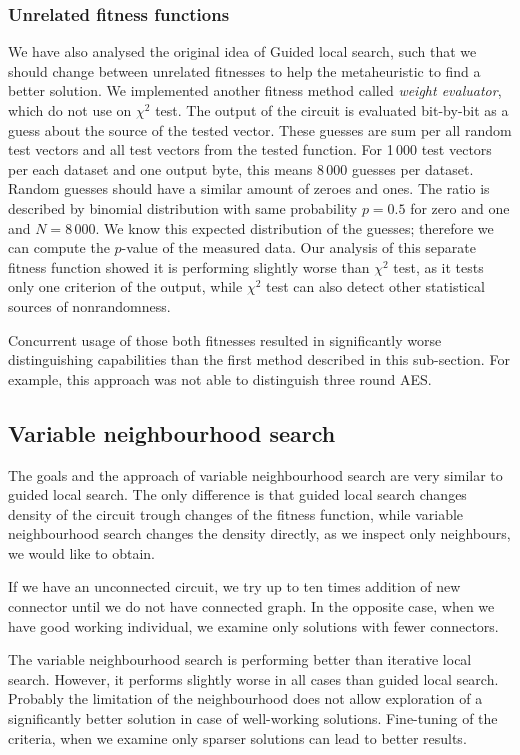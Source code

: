 \documentclass[
  print, %
  Table,   %
  nolof,     %
  nolot,     %
  11pt, %
  oneside  %
]{fithesis3}
\begin{document}
\subsubsection{\textbf{Unrelated fitness functions}}

We have also analysed the original idea of Guided local search, such that we should change between unrelated fitnesses to help the metaheuristic to find a better solution. We implemented another fitness method called \textit{weight evaluator}, which do not use on $\chi^{2}$ test. The output of the circuit is evaluated bit-by-bit as a guess about the source of the tested vector. These guesses are sum per all random test vectors and all test vectors from the tested function. For 1\,000 test vectors per each dataset and one output byte, this means 8\,000 guesses per dataset. Random guesses should have a similar amount of zeroes and ones. The ratio is described by binomial distribution with same probability $p = 0.5$ for zero and one and $N = 8\,000$. We know this expected distribution of the guesses; therefore we can compute the $p$-value of the measured data. Our analysis of this separate fitness function showed it is performing slightly worse than $\chi^{2}$ test, as it tests only one criterion of the output, while $\chi^{2}$ test can also detect other statistical sources of nonrandomness.

Concurrent usage of those both fitnesses resulted in significantly worse distinguishing capabilities than the first method described in this sub-section. For example, this approach was not able to distinguish three round AES.


\subsection{Variable neighbourhood search}
\label{subsec:res-ss-vns}

The goals and the approach of variable neighbourhood search are very similar to guided local search. The only difference is that guided local search changes density of the circuit trough changes of the fitness function, while variable neighbourhood search changes the density directly, as we inspect only neighbours, we would like to obtain.

If we have an unconnected circuit, we try up to ten times addition of new connector until we do not have connected graph. In the opposite case, when we have good working individual, we examine only solutions with fewer connectors.

The variable neighbourhood search is performing better than iterative local search. However, it performs slightly worse in all cases than guided local search. Probably the limitation of the neighbourhood does not allow exploration of a significantly better solution in case of well-working solutions. Fine-tuning of the criteria, when we examine only sparser solutions can lead to better results.
\end{document}
